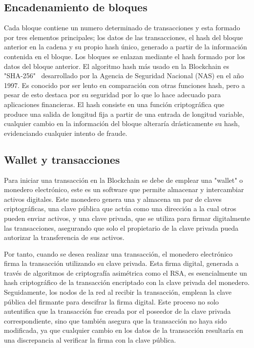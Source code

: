 

\subsection{Encadenamiento de bloques}

Cada bloque contiene un numero determinado de transacciones y esta formado por tres elementos principales; los datos de las transacciones, el hash del bloque anterior en la cadena  y su propio hash único, generado a partir de la información contenida en el bloque.
Los bloques se enlazan mediante el hash formado por los datos del bloque anterior.
El algoritmo hash más usado en la Blockchain es "SHA-256"~\cite{sha256} desarrollado por la Agencia de Seguridad Nacional (NAS) en el año 1997. Es conocido por ser lento en comparación con otras funciones hash, pero a pesar de esto destaca por su seguridad por lo que lo hace adecuado para aplicaciones financieras.
El hash consiste en una función criptográfica que produce una salida de longitud fija a partir de una entrada de longitud variable, cualquier cambio en la información del bloque alteraría drásticamente su hash, evidenciando cualquier intento de fraude.



\subsection{Wallet y transacciones}

Para iniciar una transacción en la Blockchain se debe de emplear una "wallet" o monedero electrónico, este es un software que permite almacenar y intercambiar activos digitales.
Este monedero genera una y almacena un par de claves criptográficas, una clave pública que actúa como una dirección a la cual otros pueden enviar activos, y una clave privada, que se utiliza para firmar digitalmente las transacciones, asegurando que solo el propietario de la clave privada pueda autorizar la transferencia de sus activos.

Por tanto, cuando se desea realizar una transacción, el monedero electrónico firma la transacción utilizando su clave privada. Esta firma digital, generada a través de algoritmos de criptografía asimétrica como el RSA, es esencialmente un hash criptográfico de la transacción encriptado con la clave privada del monedero.
Seguidamente, los nodos de la red al recibir la transacción, emplean la clave pública del firmante para descifrar la firma digital. Este proceso no solo autentifica que la transacción fue creada por el poseedor de la clave privada correspondiente, sino que también asegura que la transacción no haya sido modificada, ya que cualquier cambio en los datos de la transacción resultaría en una discrepancia al verificar la firma con la clave pública.

